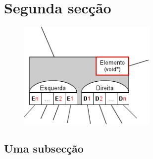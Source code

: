 \documentclass[a5paper,twocolumn, 11pt]{article}
\begin{document}
\clearpage
\section{Segunda secção}
\lipsum[1-1]
\begin{figure}[htb!]
    \includegraphics[width=190pt]{image2.png}
\end{figure}
\lipsum[1-1]

\newpage
\subsection{Uma subsecção}
\lipsum[1-3]

\clearpage
\onecolumn
\end{document}
